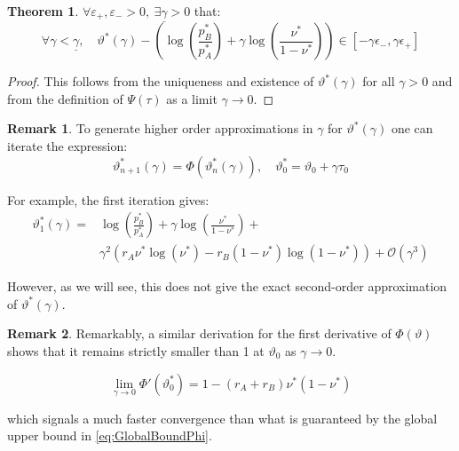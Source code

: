 \documentclass{article}
\theoremstyle{definition}
\newtheorem{theorem}{Theorem}[section]
\newtheorem*{remark}{Remark}
\begin{document}
\begin{theorem}
    $\forall \varepsilon_{+}, \varepsilon_{-} > 0, \ \exists \underline{\gamma}>0$ that:
    \begin{equation}
        \forall \gamma < \underline{\gamma}, \quad  \vartheta^*(\gamma) -
        \left ( \log \left ( \frac{p^*_B}{p^*_A} \right ) + \gamma \log \left ( \frac{\nu^*}{1-\nu^*} \right ) \right ) \in [-\gamma \epsilon_{-}, \gamma \epsilon_{+}]
    \end{equation}
\end{theorem}

\begin{proof}
    This follows from the uniqueness and existence of $\vartheta^*(\gamma)$ for all $\gamma>0$ and from the definition of $\Psi(\tau)$ as a limit $\gamma \to 0$.

\end{proof}

\begin{remark}
    To generate higher order approximations in $\gamma$ for $\vartheta^*(\gamma)$ one can iterate the expression:
    \begin{equation}
        \vartheta^*_{n+1}(\gamma) = \Phi(\vartheta^*_n(\gamma)), \quad
        \vartheta^*_0 = \vartheta_0 + \gamma \tau_0
    \end{equation}

    For example, the first iteration gives:
    \begin{equation}
        \begin{split}
            \vartheta^*_1(\gamma) =& \log \left ( \frac{p^*_B}{p^*_A} \right ) + \gamma \log \left ( \frac{\nu^*}{1-\nu^*} \right ) + \\ 
            & \gamma^2 \left ( r_A \nu^* \log(\nu^*) - r_B (1-\nu^*) \log(1-\nu^*)\right )+
            \mathcal{O}(\gamma^3)
        \end{split}
    \end{equation}

    However, as we will see, this does not give the exact second-order approximation of $\vartheta^*(\gamma)$.
    
\end{remark}

\begin{remark}
    Remarkably, a similar derivation for the first derivative of $\Phi(\vartheta)$ shows that it remains strictly smaller than 1 at $\vartheta_0$ as $\gamma \to 0$.

    \begin{equation}
        \lim_{\gamma \to 0} \Phi'(\vartheta^*_0) = 1 - (r_A + r_B) \nu^* (1-\nu^*)
    \end{equation}

    which signals a much faster convergence than what is guaranteed by the global upper bound in \eqref{eq:GlobalBoundPhi}.
    
\end{remark}
\end{document}
